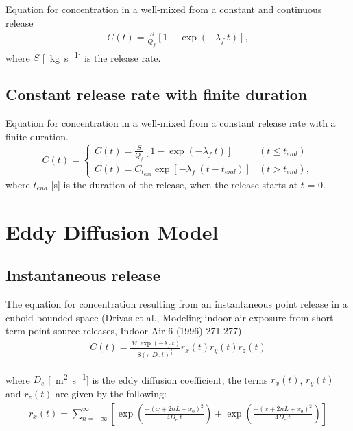 \documentclass[]{article}
\begin{document}
Equation for concentration in a well-mixed from a constant and continuous release
\begin{eqnarray}\label{eq:WMCont}
	C(t) = \frac{S}{Q_f} \left[1 - \exp\left( -\lambda_f\:t\right) \right],
\end{eqnarray}
where $S$ [\SI{}{\kilo\gram\per\second}] is the release rate. 

\subsection{Constant release rate with finite duration}\label{sec:WMFinite}

Equation for concentration in a well-mixed from a constant release rate with a
finite duration.
\begin{equation}\label{eq:WMFinite}
	C(t) = 
	\begin{cases} 
		C(t) = \frac{S}{Q_f} \left[1 - \exp\left( -\lambda_f\:t\right) \right]								& (t \leq t_{end}) \\
		C(t) = C_{t_{end}} \exp\left[-\lambda_f\:(t - t_{end})\right]											& (t > t_{end}),
	\end{cases} 
\end{equation}
where $t_{end}$ [s] is the duration of the release, when the release starts at
$t$ = 0.

\section{Eddy Diffusion Model}\label{app:eddydiff}

\subsection{Instantaneous release}\label{app:EddyInst}

The equation for concentration resulting from an instantaneous point release in
a cuboid bounded space (Drivas et al., Modeling indoor air exposure from
short-term point source releases, Indoor Air 6 (1996) 271-277).
\begin{eqnarray}\label{eq:cuboid-decay-inst}
	C(t) = \frac{M\: \exp(-\lambda_f\:t)}{8(\pi\:D_e\:t)^{\frac{3}{2}}} r_{x}(t)
	r_{y}(t) r_{z}(t)
\end{eqnarray}

where $D_e$ [\SI{}{\meter\squared\per\second}] is the eddy diffusion
coefficient, the terms $r_{x}(t)$, $r_{y}(t)$ and $r_{z}(t)$ are given by the
following:
\begin{eqnarray}
	r_{x}(t) = \sum^{\infty}_{n = -\infty} \left[\exp\left(\frac{-(x + 2nL -
	x_{0})^{2}}{4D_e\:t}\right) + \exp\left(\frac{-(x + 2nL +
	x_{0})^{2}}{4D_e\:t}\right)\right]
\end{eqnarray}
\end{document}
